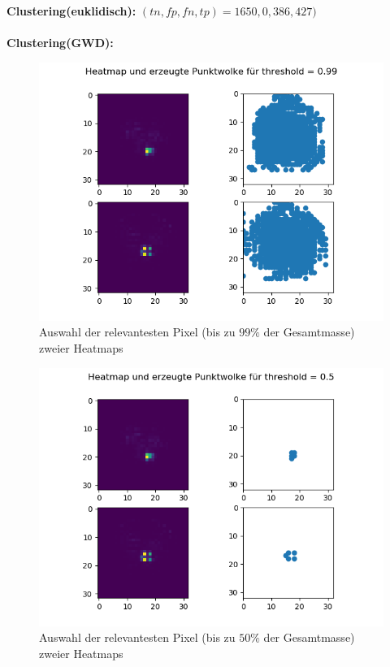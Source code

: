\documentclass[twoside, 11pt,a4paper]{article}
\numberwithin{equation}{section}
\begin{document}
	\noindent \textbf{Clustering(euklidisch):}
	$(tn, fp, fn, tp) = 1650, 0, 386, 427)$\\
	\\
	\noindent \textbf{Clustering(GWD):}
	\begin{figure}[h]
		\begin{center}
			\includegraphics[width=0.5\textheight]{HeatmapPunktwolke99.png}
			\caption{Auswahl der relevantesten Pixel (bis zu $99\%$ der Gesamtmasse) zweier Heatmaps}
		\end{center}
	\end{figure}
	
	\begin{figure}[h]
		\begin{center}
			\includegraphics[width=0.5\textheight]{HeatmapPunktwolke50.png}
			\caption{Auswahl der relevantesten Pixel (bis zu $50\%$ der Gesamtmasse) zweier Heatmaps}
		\end{center}
	\end{figure}
	
\end{document}
